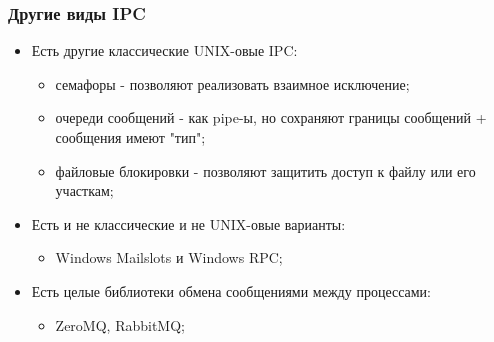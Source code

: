 \begin{frame}
\frametitle{Другие виды IPC}

\begin{itemize}
  \item<1-> Есть другие классические UNIX-овые IPC:
    \begin{itemize}
      \item семафоры - позволяют реализовать взаимное исключение;
      \item очереди сообщений - как pipe-ы, но сохраняют границы сообщений + сообщения имеют "тип";
      \item файловые блокировки - позволяют защитить доступ к файлу или его участкам;
    \end{itemize}
  \item<2-> Есть и не классические и не UNIX-овые варианты:
    \begin{itemize}
      \item Windows Mailslots и Windows RPC;
    \end{itemize}
  \item<3-> Есть целые библиотеки обмена сообщениями между процессами:
    \begin{itemize}
      \item ZeroMQ, RabbitMQ;
    \end{itemize}
\end{itemize}
\end{frame}
